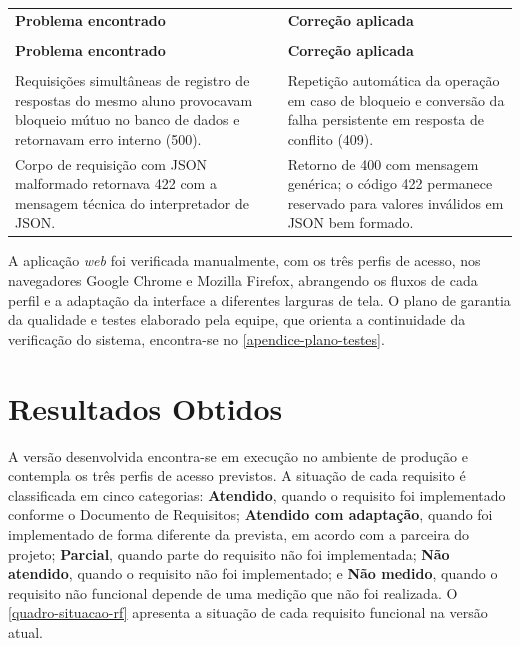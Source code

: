 {\ABNTEXfontereduzida
\renewcommand{\arraystretch}{1.25}
\begin{xltabular}{\textwidth}{|>{\raggedright\arraybackslash}p{5.9cm}|>{\raggedright\arraybackslash}X|}
 \\[0.3em]
\hline
\textbf{Problema encontrado} & \textbf{Correção aplicada} \\
\hline
\endfirsthead
{} \\
\hline
\textbf{Problema encontrado} & \textbf{Correção aplicada} \\
\hline
\endhead
{} \\
\endfoot
\endlastfoot
Requisições simultâneas de registro de respostas do mesmo aluno provocavam bloqueio mútuo no banco de dados e retornavam erro interno (500). & Repetição automática da operação em caso de bloqueio e conversão da falha persistente em resposta de conflito (409). \\
\hline
Corpo de requisição com JSON malformado retornava 422 com a mensagem técnica do interpretador de JSON. & Retorno de 400 com mensagem genérica; o código 422 permanece reservado para valores inválidos em JSON bem formado. \\
\hline
\end{xltabular}
}

A aplicação \textit{web} foi verificada manualmente, com os três perfis de acesso, nos navegadores Google Chrome e Mozilla Firefox, abrangendo os fluxos de cada perfil e a adaptação da interface a diferentes larguras de tela. O plano de garantia da qualidade e testes elaborado pela equipe, que orienta a continuidade da verificação do sistema, encontra-se no \autoref{apendice-plano-testes}.

\section{Resultados Obtidos}

A versão desenvolvida encontra-se em execução no ambiente de produção e contempla os três perfis de acesso previstos. A situação de cada requisito é classificada em cinco categorias: \textbf{Atendido}, quando o requisito foi implementado conforme o Documento de Requisitos; \textbf{Atendido com adaptação}, quando foi implementado de forma diferente da prevista, em acordo com a parceira do projeto; \textbf{Parcial}, quando parte do requisito não foi implementada; \textbf{Não atendido}, quando o requisito não foi implementado; e \textbf{Não medido}, quando o requisito não funcional depende de uma medição que não foi realizada. O \autoref{quadro-situacao-rf} apresenta a situação de cada requisito funcional na versão atual.

